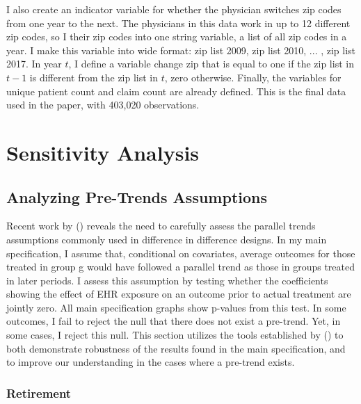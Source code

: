 \documentclass[12pt]{article}
\begin{document}
I also create an indicator variable for whether the physician switches zip codes from one year to the next. The physicians in this data work in up to 12 different zip codes, so I their zip codes into one string variable, a list of all zip codes in a year. I make this variable into wide format: zip list 2009, zip list 2010, ... , zip list 2017.  In year $t$, I define a variable change zip that is equal to one if the zip list in $t-1$ is different from the zip list in $t$, zero otherwise. Finally, the variables for unique patient count and claim count are already defined. This is the final data used in the paper, with 403,020 observations. 



\section{Sensitivity Analysis}

\subsection{Analyzing Pre-Trends Assumptions}\label{sec:pretrends}

Recent work by \citeauthor{rambachan2019honest} (\citeyear{rambachan2019honest}) reveals the need to carefully assess the parallel trends assumptions commonly used in difference in difference designs. In my main specification, I assume that, conditional on covariates, average outcomes for those treated in group g would have followed a parallel trend as those in groups treated in later periods. I assess this assumption by testing whether the coefficients showing the effect of EHR exposure on an outcome prior to actual treatment are jointly zero. All main specification graphs show p-values from this test. In some outcomes, I fail to reject the null that there does not exist a pre-trend. Yet, in some cases, I reject this null. This section utilizes the tools established by \citeauthor{rambachan2019honest} (\citeyear{rambachan2019honest}) to both demonstrate robustness of the results found in the main specification, and to improve our understanding in the cases where a pre-trend exists. 

\subsubsection{Retirement} 
\end{document}
